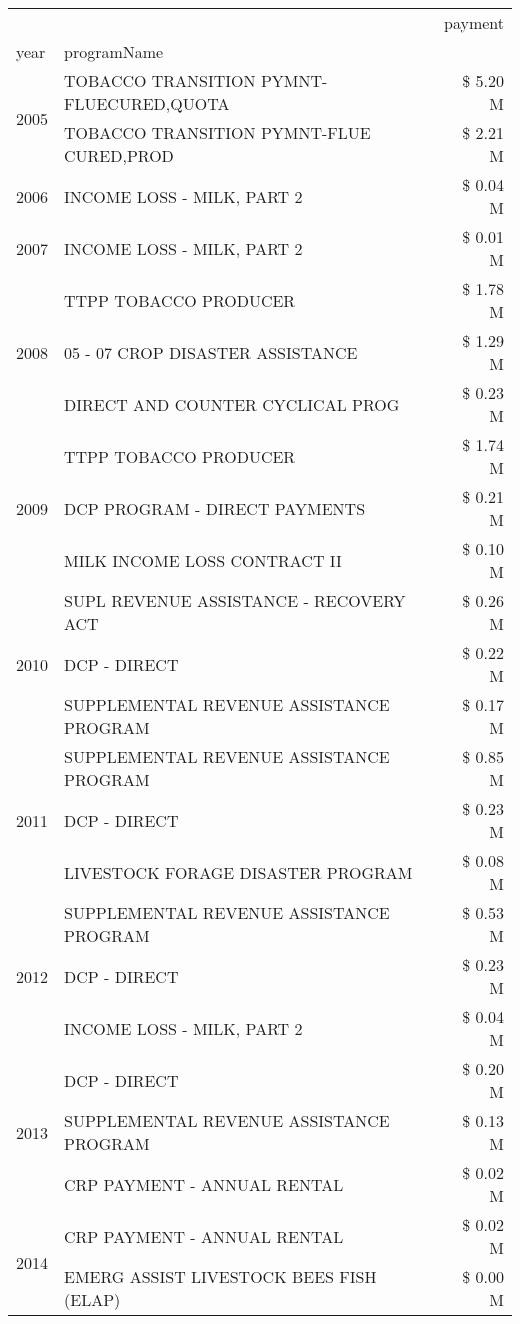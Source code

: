 \begin{tabular}{llr}
\toprule
 &  & payment \\
year & programName &  \\
\midrule
\multirow[t]{2}{*}{2005} & TOBACCO TRANSITION PYMNT-FLUECURED,QUOTA & \$ 5.20 M \\
 & TOBACCO TRANSITION PYMNT-FLUE CURED,PROD & \$ 2.21 M \\
\cline{1-3}
2006 & INCOME LOSS - MILK, PART 2 & \$ 0.04 M \\
\cline{1-3}
2007 & INCOME LOSS - MILK, PART 2 & \$ 0.01 M \\
\cline{1-3}
\multirow[t]{3}{*}{2008} & TTPP TOBACCO PRODUCER & \$ 1.78 M \\
 & 05 - 07 CROP DISASTER ASSISTANCE & \$ 1.29 M \\
 & DIRECT AND COUNTER CYCLICAL PROG & \$ 0.23 M \\
\cline{1-3}
\multirow[t]{3}{*}{2009} & TTPP TOBACCO PRODUCER & \$ 1.74 M \\
 & DCP PROGRAM - DIRECT PAYMENTS & \$ 0.21 M \\
 & MILK INCOME LOSS CONTRACT II & \$ 0.10 M \\
\cline{1-3}
\multirow[t]{3}{*}{2010} & SUPL REVENUE ASSISTANCE - RECOVERY ACT & \$ 0.26 M \\
 & DCP - DIRECT & \$ 0.22 M \\
 & SUPPLEMENTAL REVENUE ASSISTANCE PROGRAM & \$ 0.17 M \\
\cline{1-3}
\multirow[t]{3}{*}{2011} & SUPPLEMENTAL REVENUE ASSISTANCE PROGRAM & \$ 0.85 M \\
 & DCP - DIRECT & \$ 0.23 M \\
 & LIVESTOCK FORAGE DISASTER PROGRAM & \$ 0.08 M \\
\cline{1-3}
\multirow[t]{3}{*}{2012} & SUPPLEMENTAL REVENUE ASSISTANCE PROGRAM & \$ 0.53 M \\
 & DCP - DIRECT & \$ 0.23 M \\
 & INCOME LOSS - MILK, PART 2 & \$ 0.04 M \\
\cline{1-3}
\multirow[t]{3}{*}{2013} & DCP - DIRECT & \$ 0.20 M \\
 & SUPPLEMENTAL REVENUE ASSISTANCE PROGRAM & \$ 0.13 M \\
 & CRP PAYMENT - ANNUAL RENTAL & \$ 0.02 M \\
\cline{1-3}
\multirow[t]{3}{*}{2014} & CRP PAYMENT - ANNUAL RENTAL & \$ 0.02 M \\
 & EMERG ASSIST LIVESTOCK BEES FISH (ELAP) & \$ 0.00 M \\

\end{tabular}
